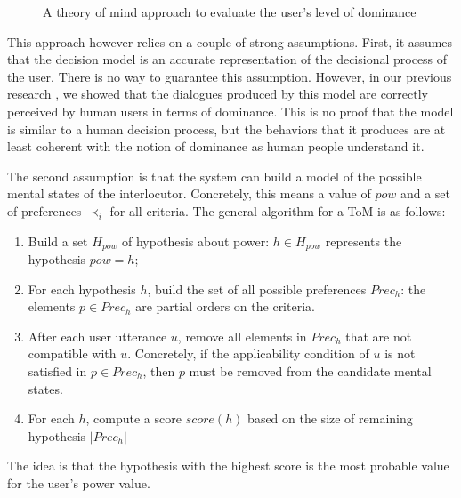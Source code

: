 \documentclass[sigconf]{aamas}  %
\begin{document}
	\begin{figure}
			\caption{A theory of mind approach to evaluate the user's level of dominance} 
			\label{fig:tom}
	\end{figure} 

	This approach however relies on a couple of strong assumptions. First, it assumes that the decision model is an accurate representation of the decisional process of the user. There is no way to guarantee this assumption. However, in our previous research \cite{ouali2017computational}, we showed that the dialogues produced by this model are correctly perceived by human users in terms of dominance. This is no proof that the model is similar to a human decision process, but the behaviors that it produces are at least coherent with the notion of dominance as human people understand it.
	
	The second assumption is that the system can build a model of the possible mental states of the interlocutor. Concretely, this means a value of $pow$ and a set of preferences $\prec_i$ for all criteria. The general algorithm for a ToM is as follows:
	\begin{enumerate}
	\item Build a set $H_{pow}$ of hypothesis about power: $h\in H_{pow}$ represents the hypothesis $pow=h$;
	\item For each hypothesis $h$, build the set of all possible preferences $Prec_h$: the elements $p\in Prec_h$ are partial orders on the criteria.
	\item After each user utterance $u$, remove all elements in $Prec_h$ that are not compatible with $u$. Concretely, if the applicability condition of $u$ is not satisfied in $p\in Prec_h$, then $p$ must be removed from the candidate mental states.
	\item For each $h$, compute a score $score(h)$ based on the size of remaining hypothesis $|Prec_h|$
	\end{enumerate}
	The idea is that the hypothesis with the highest score is the most probable value for the user's power value.
\end{document}
